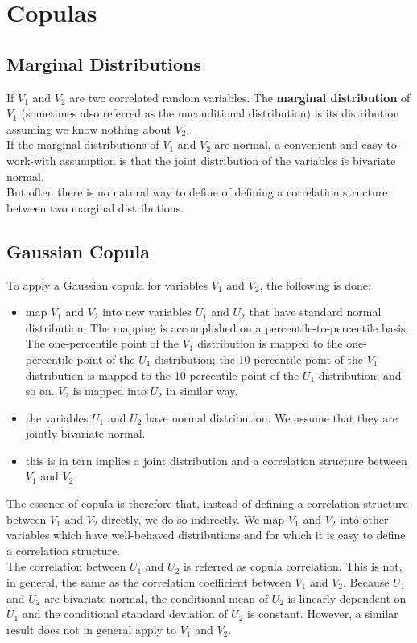 \chapter{Copulas}

\section{Marginal Distributions}
If $V_{1}$ and $V_{2}$ are two correlated random variables. The \textbf{\color{blue}marginal distribution} of $V_{1}$ (sometimes also referred as the unconditional distribution) is its distribution assuming we know nothing about $V_{2}$.\\
If the marginal distributions of $V_{1}$ and $V_{2}$ are normal, a convenient and easy-to-work-with assumption is that the joint distribution of the variables is bivariate normal.\\
But often there is no natural way to define of defining a correlation structure between two marginal distributions.

\section{Gaussian Copula}
To apply a Gaussian copula for variables $V_{1}$ and $V_{2}$, the following is done:
\begin{itemize}
	\item map $V_{1}$ and $V_{2}$ into new variables $U_{1}$ and $U_{2}$ that have standard normal distribution. The mapping is accomplished on a percentile-to-percentile basis. The one-percentile point of the $V_{1}$ distribution is mapped to the one-percentile point of the $U_{1}$ distribution; the 10-percentile point of the $V_{1}$ distribution is mapped to the 10-percentile point of the $U_{1}$ distribution; and so on. $V_{2}$ is mapped into $U_{2}$ in similar way.
	\item the variables $U_{1}$ and $U_{2}$ have normal distribution. We assume that they are jointly bivariate normal.
	\item this is in tern implies a joint distribution and a correlation structure between $V_{1}$ and $V_{2}$
\end{itemize}
The essence of copula is therefore that, instead of defining a correlation structure between $V_{1}$ and $V_{2}$ directly, we do so indirectly. We map $V_{1}$ and $V_{2}$ into other variables which have well-behaved distributions and for which it is easy to define a correlation structure.\\
The correlation between $U_{1}$ and $U_{2}$ is referred as copula correlation. This is not, in general, the same as the correlation coefficient between $V_{1}$ and $V_{2}$. Because $U_{1}$ and $U_{2}$ are bivariate normal, the conditional mean of $U_{2}$ is linearly dependent on $U_{1}$ and the conditional standard deviation of $U_{2}$ is constant. However, a similar result does not in general apply to $V_{1}$ and $V_{2}$.

